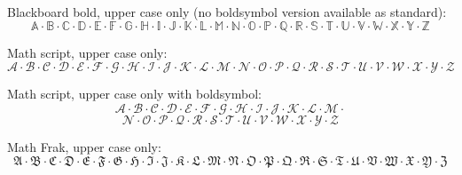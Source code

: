 \documentclass[12pt,a4paper]{article}
\theoremstyle{clearprint}
\begin{document}
\noindent 
Blackboard bold, upper case only (no boldsymbol version available as standard):
\begin{equation}
\mathbb{A} \cdot \mathbb{B} \cdot \mathbb{C} \cdot \mathbb{D} \cdot \mathbb{E} \cdot \mathbb{F} \cdot \mathbb{G} \cdot \mathbb{H} \cdot \mathbb{I} \cdot \mathbb{J} \cdot \mathbb{K} \cdot \mathbb{L} \cdot \mathbb{M} \cdot \mathbb{N} \cdot \mathbb{O} \cdot \mathbb{P} \cdot \mathbb{Q} \cdot \mathbb{R} \cdot \mathbb{S} \cdot \mathbb{T} \cdot \mathbb{U} \cdot \mathbb{V} \cdot \mathbb{W} \cdot \mathbb{X} \cdot \mathbb{Y} \cdot \mathbb{Z}
\end{equation}

\noindent
Math script, upper case only:
\begin{equation}
\mathscr{A} \cdot \mathscr{B} \cdot \mathscr{C} \cdot \mathscr{D} \cdot \mathscr{E} \cdot \mathscr{F} \cdot \mathscr{G} \cdot \mathscr{H} \cdot \mathscr{I} \cdot \mathscr{J} \cdot \mathscr{K} \cdot \mathscr{L} \cdot \mathscr{M} \cdot \mathscr{N} \cdot \mathscr{O} \cdot \mathscr{P} \cdot \mathscr{Q} \cdot \mathscr{R} \cdot \mathscr{S} \cdot \mathscr{T} \cdot \mathscr{U} \cdot \mathscr{V} \cdot \mathscr{W} \cdot \mathscr{X} \cdot \mathscr{Y} \cdot \mathscr{Z}
\end{equation}

\noindent
Math script, upper case only with boldsymbol:
\begin{equation}
\boldsymbol{\mathscr{A} \cdot \mathscr{B} \cdot \mathscr{C} \cdot \mathscr{D} \cdot \mathscr{E} \cdot \mathscr{F} \cdot \mathscr{G} \cdot \mathscr{H} \cdot \mathscr{I} \cdot \mathscr{J} \cdot \mathscr{K} \cdot \mathscr{L} \cdot \mathscr{M} \cdot }
\end{equation}
\begin{equation}
\boldsymbol{\mathscr{N} \cdot \mathscr{O} \cdot \mathscr{P} \cdot \mathscr{Q} \cdot \mathscr{R} \cdot \mathscr{S} \cdot \mathscr{T} \cdot \mathscr{U} \cdot \mathscr{V} \cdot \mathscr{W} \cdot \mathscr{X} \cdot \mathscr{Y} \cdot \mathscr{Z}}
\end{equation}

\noindent
Math Frak, upper case only:
\begin{equation}
\mathfrak{A} \cdot \mathfrak{B} \cdot \mathfrak{C} \cdot \mathfrak{D} \cdot \mathfrak{E} \cdot \mathfrak{F} \cdot \mathfrak{G} \cdot \mathfrak{H} \cdot \mathfrak{I} \cdot \mathfrak{J} \cdot \mathfrak{K} \cdot \mathfrak{L} \cdot \mathfrak{M} \cdot \mathfrak{N} \cdot \mathfrak{O} \cdot \mathfrak{P} \cdot \mathfrak{Q} \cdot \mathfrak{R} \cdot \mathfrak{S} \cdot \mathfrak{T} \cdot \mathfrak{U} \cdot \mathfrak{V} \cdot \mathfrak{W} \cdot \mathfrak{X} \cdot \mathfrak{Y} \cdot \mathfrak{Z}
\end{equation}
\end{document}
